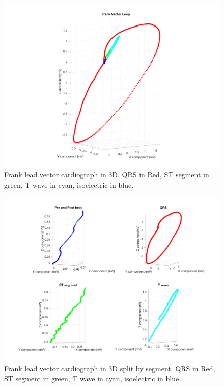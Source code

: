 \documentclass[12pt]{article}
\begin{document}
\begin{figure}[H]
	
	\centering
	\includegraphics[width = .95\textwidth]{Figures/FrankLeads_3d.png}
	\caption{Frank lead vector cardiograph in 3D. QRS in Red, ST segment in green, T wave in cyan, isoelectric in blue.}
	\label{fig:Frank3D}
\end{figure}

\begin{figure}[H]
	
	\centering
	\includegraphics[width = .95\textwidth]{Figures/FrankLeads_3d_split.png}
	\caption{Frank lead vector cardiograph in 3D split by segment. QRS in Red, ST segment in green, T wave in cyan, isoelectric in blue.}
	\label{fig:Frank3D_split}
\end{figure}
\end{document}
